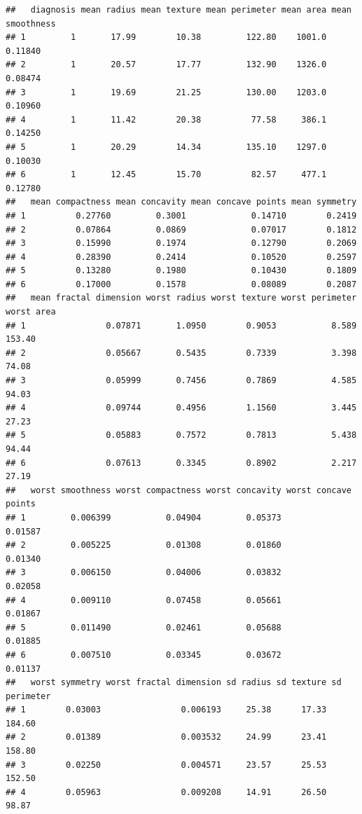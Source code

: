\documentclass[
]{article}
\begin{document}
\begin{verbatim}
##   diagnosis mean radius mean texture mean perimeter mean area mean smoothness
## 1         1       17.99        10.38         122.80    1001.0         0.11840
## 2         1       20.57        17.77         132.90    1326.0         0.08474
## 3         1       19.69        21.25         130.00    1203.0         0.10960
## 4         1       11.42        20.38          77.58     386.1         0.14250
## 5         1       20.29        14.34         135.10    1297.0         0.10030
## 6         1       12.45        15.70          82.57     477.1         0.12780
##   mean compactness mean concavity mean concave points mean symmetry
## 1          0.27760         0.3001             0.14710        0.2419
## 2          0.07864         0.0869             0.07017        0.1812
## 3          0.15990         0.1974             0.12790        0.2069
## 4          0.28390         0.2414             0.10520        0.2597
## 5          0.13280         0.1980             0.10430        0.1809
## 6          0.17000         0.1578             0.08089        0.2087
##   mean fractal dimension worst radius worst texture worst perimeter worst area
## 1                0.07871       1.0950        0.9053           8.589     153.40
## 2                0.05667       0.5435        0.7339           3.398      74.08
## 3                0.05999       0.7456        0.7869           4.585      94.03
## 4                0.09744       0.4956        1.1560           3.445      27.23
## 5                0.05883       0.7572        0.7813           5.438      94.44
## 6                0.07613       0.3345        0.8902           2.217      27.19
##   worst smoothness worst compactness worst concavity worst concave points
## 1         0.006399           0.04904         0.05373              0.01587
## 2         0.005225           0.01308         0.01860              0.01340
## 3         0.006150           0.04006         0.03832              0.02058
## 4         0.009110           0.07458         0.05661              0.01867
## 5         0.011490           0.02461         0.05688              0.01885
## 6         0.007510           0.03345         0.03672              0.01137
##   worst symmetry worst fractal dimension sd radius sd texture sd perimeter
## 1        0.03003                0.006193     25.38      17.33       184.60
## 2        0.01389                0.003532     24.99      23.41       158.80
## 3        0.02250                0.004571     23.57      25.53       152.50
## 4        0.05963                0.009208     14.91      26.50        98.87

\end{verbatim}
\end{document}
